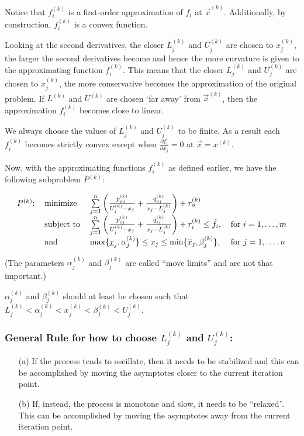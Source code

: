 Notice that $f_i^{(k)}$ is a first-order approximation of $f_i$ at $\vec{x}^{(k)}$. Additionally, by construction, $f_i^{(k)}$ is a {\color{tiananmen}convex function}.

Looking at the second derivatives, the closer $L_j^{(k)}$ and $U_j^{(k)}$ are chosen to $x_j^{(k)}$, the larger the second derivatives become and hence the more curvature is given to the approximating function $f_i^{(k)}$. This means that the closer $L_j^{(k)}$ and $U_j^{(k)}$ are chosen to $x_j^{(k)}$, the more conservative becomes the approximation of the original problem. If $L^{(k)}$ and $U^{(k)}$ are chosen `far away' from $\vec{x}^{(k)}$, then the approximation $f_i^{(k)}$ becomes close to linear.

We always choose the values of $L_j^{(k)}$ and $U_j^{(k)}$ to be finite. As a result each $f_i^{(k)}$ becomes strictly convex except when $\frac{\partial f_i}{\partial x_j}=0$ at $\vec{x}=x^{(k)}$.

Now, with the approximating functions $f_i^{(k)}$ as defined earlier, we have the following subproblem $P^{(k)}$:

{\color{baystate}
	\begin{equation}
		\begin{tabular}{llll}
			$P^{(k)}$: & minimize & $\sum\limits_{j=1}^{n}\left(\frac{p_{oj}^{(k)}}{U_j^{(k)}-x_j}+\frac{q_{oj}^{(k)}}{x_j-L_j^{(k)}}\right)+r_o^{(k)}$ &  \\
			& subject to & $\sum\limits_{j=1}^{n}\left(\frac{p_{ij}^{(k)}}{U_j^{(k)}-x_j}+\frac{q_{ij}^{(k)}}{x_j-L_j^{(k)}}\right)+r_i^{(k)}\leq\hat{f}_i$, & for $i=1,\ldots,m$ \\
			& and & $\max\lbrace\underline{x}_j,\alpha_j^{(k)}\rbrace\leq x_j\leq \min\lbrace \overline{x}_j,\beta_j^{(k)}\rbrace$, & for $j=1,\ldots,n$
		\end{tabular}
	\end{equation}
}

(The parameters $\alpha_j^{(k)}$ and $\beta_j^{(k)}$ are called ``{\color{tiananmen}move limits}'' and are not that important.)

$\alpha_j^{(k)}$ and $\beta_j^{(k)}$ should at least be chosen such that $L_j^{(k)}<\alpha_j^{(k)}<x_j^{(k)}<\beta_j^{(k)}<U_j^{(k)}$.

\subsubsection*{General Rule for how to choose $L_j^{(k)}$ and $U_j^{(k)}$:}
\begin{itemize}
	\item[(a)] If the process tends to oscillate, then it needs to be stabilized and this can be accomplished by moving the asymptotes closer to the current iteration point.
	\item[(b)] If, instead, the process is monotone and slow, it needs to be ``relaxed''. This can be accomplished by moving the asymptotes away from the current iteration point.
\end{itemize}


